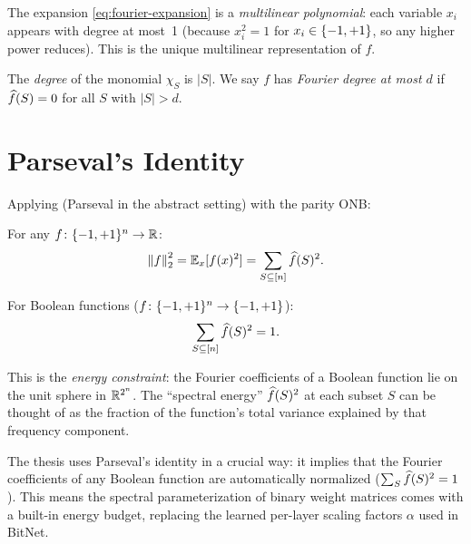 The expansion \eqref{eq:fourier-expansion} is a \emph{multilinear
polynomial}: each variable $x_i$ appears with degree at most~1 (because
$x_i^2 = 1$ for $x_i \in \{-1,+1\}$, so any higher power reduces). This is
the unique multilinear representation of $f$.

\begin{definition}[Degree]\label{def:degree}
The \emph{degree} of the monomial $\chi_S$ is $|S|$. We say $f$ has
\emph{Fourier degree at most $d$} if $\widehat{f}(S) = 0$ for all $S$ with
$|S| > d$.
\end{definition}


\section{Parseval's Identity}\label{sec:parseval}

Applying  (Parseval in the abstract setting)
with the parity ONB:

\begin{theorem}\label{thm:parseval}
For any $f \colon \{-1,+1\}^n \to \mathbb{R}$:
\begin{equation}\label{eq:parseval}
  \left\| f \right\|_2^2 = \mathbb{E}_x[f(x)^2] = \sum_{S \subseteq [n]} \widehat{f}(S)^2.
\end{equation}
\end{theorem}

For Boolean functions ($f \colon \{-1,+1\}^n \to \{-1,+1\}$):
\begin{equation}\label{eq:parseval-boolean}
  \sum_{S \subseteq [n]} \widehat{f}(S)^2 = 1.
\end{equation}

This is the \emph{energy constraint}: the Fourier coefficients of a
Boolean function lie on the unit sphere in $\mathbb{R}^{2^n}$. The ``spectral
energy'' $\widehat{f}(S)^2$ at each subset $S$ can be thought of as the
fraction of the function's total variance explained by that frequency
component.

\begin{remark}\label{rem:parseval-thesis}
The thesis uses Parseval's identity in a crucial way: it implies that the
Fourier coefficients of any Boolean function are automatically normalized
($\sum_S \widehat{f}(S)^2 = 1$). This means the spectral parameterization of
binary weight matrices comes with a built-in energy budget, replacing the
learned per-layer scaling factors $\alpha$ used in BitNet.
\end{remark}


